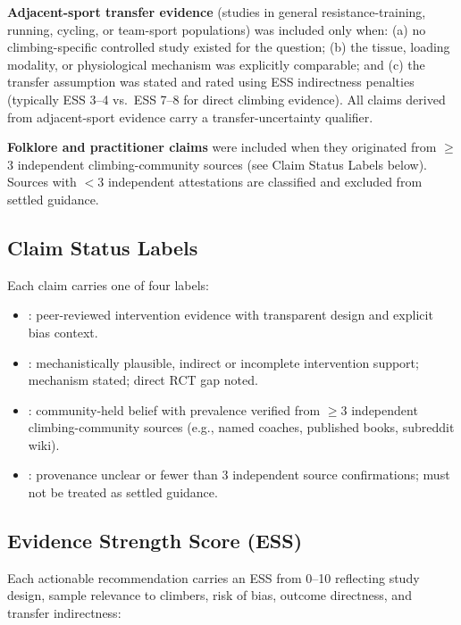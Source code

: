\textbf{Adjacent-sport transfer evidence} (studies in general resistance-training, running, cycling, or team-sport populations) was included only when: (a) no climbing-specific controlled study existed for the question; (b) the tissue, loading modality, or physiological mechanism was explicitly comparable; and (c) the transfer assumption was stated and rated using ESS indirectness penalties (typically ESS 3--4 vs.\ ESS 7--8 for direct climbing evidence). All claims derived from adjacent-sport evidence carry a transfer-uncertainty qualifier.

\textbf{Folklore and practitioner claims} were included when they originated from $\geq$3 independent climbing-community sources (see Claim Status Labels below). Sources with $<$3 independent attestations are classified \toverify and excluded from settled guidance.

\subsection*{Claim Status Labels}

Each claim carries one of four labels:
\begin{itemize}[noitemsep]
  \item \textbf{\evidencebacked}: peer-reviewed intervention evidence with transparent design and explicit bias context.
  \item \textbf{\bioplausible}: mechanistically plausible, indirect or incomplete intervention support; mechanism stated; direct RCT gap noted.
  \item \textbf{\folkloreverified}: community-held belief with prevalence verified from $\geq$3 independent climbing-community sources (e.g., named coaches, published books, subreddit wiki).
  \item \textbf{\toverify}: provenance unclear or fewer than 3 independent source confirmations; must not be treated as settled guidance.
\end{itemize}

\subsection*{Evidence Strength Score (ESS)}

Each actionable recommendation carries an ESS from 0--10 reflecting study design, sample relevance to climbers, risk of bias, outcome directness, and transfer indirectness:

